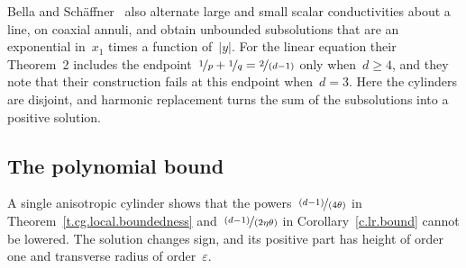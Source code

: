 \documentclass[11pt,letterpaper]{article}
\numberwithin{equation}{section}
\theoremstyle{definition}
\newcommand{\eps}{\varepsilon}
\newcommand{\nf}{\nicefrac}
\begin{document}
\smallskip
Bella and Sch\"affner~\cite[Section~3]{Bella.Schaffner.plaplace} also alternate large and small scalar conductivities about a line, on coaxial annuli, and obtain unbounded subsolutions that are an exponential in~$x_1$ times a function of~$|y|$. For the linear equation their Theorem~2 includes the endpoint~$\nf1p+\nf1q=\nf2{(d-1)}$ only when~$d\geq4$, and they note that their construction fails at this endpoint when~$d=3$. Here the cylinders are disjoint, and harmonic replacement turns the sum of the subsolutions into a positive solution.

\subsection{The polynomial bound}
\label{ss.sharpness.polynomial}

A single anisotropic cylinder shows that the powers~$\nf{(d-1)}{(4\theta)}$ in Theorem~\ref{t.cg.local.boundedness} and~$\nf{(d-1)}{(2\eta\theta)}$ in Corollary~\ref{c.lr.bound} cannot be lowered. The solution changes sign, and its positive part has height of order one and transverse radius of order~$\eps$.
\end{document}
